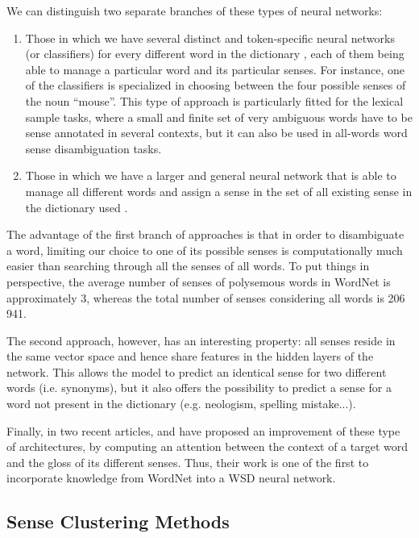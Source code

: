 \documentclass[11pt]{article}
\newcommand{\citep}[1]{\cite{#1}}
\newcommand{\citet}[1]{\newcite{#1}}
\begin{document}
We can distinguish two separate branches of these types of neural networks: 
\begin{enumerate}[leftmargin=*,topsep=0pt,itemsep=0pt,parsep=4pt]
    \item Those in which we have several distinct and token-specific neural networks (or classifiers) for every different word in the dictionary \citep{iacobacci2016embeddings,kaageback2016word}, each of them being able to manage a particular word and its particular senses. For instance, one of the classifiers is specialized in choosing between the four possible senses of the noun ``mouse''. This type of approach is particularly fitted for the lexical sample tasks, where a small and finite set of very ambiguous words have to be sense annotated in several contexts, but it can also be used in all-words word sense disambiguation tasks.
    \item Those in which we have a larger and general neural network that is able to manage all different words and assign a sense in the set of all existing sense in the dictionary used \citep{raganato2017}.
\end{enumerate}

{
\noindent The advantage of the first branch of approaches is that in order to disambiguate a word, limiting our choice to one of its possible senses is computationally much easier than searching through all the senses of all words. To put things in perspective, the average number of senses of polysemous words in WordNet is approximately 3,
whereas the total number of senses considering all words is 206\,941.}

The second approach, however, has an interesting property: all senses reside in the same vector space and hence share features in the hidden layers of the network. This allows the model to predict an identical sense for two different words (i.e. synonyms), but it also offers the possibility to predict a sense for a word not present in the dictionary (e.g. neologism, spelling mistake...).




Finally, in two recent articles, \citet{luo2018b} and \citet{luo2018a} have proposed an improvement of these type of architectures, by computing an attention between the context of a target word and the gloss of its different senses. Thus, their work is one of the first to incorporate knowledge from WordNet into a WSD neural network.

\subsection{Sense Clustering Methods}
\end{document}
